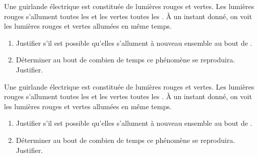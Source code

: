 \begin{exercice*}
    Une guirlande électrique est constituée de lumières rouges et vertes.
    Les lumières rouges s'allument toutes les  et les vertes toutes les .
    À un instant donné, on voit les lumières rouges et vertes allumées en même temps.
    \begin{enumerate}
        \item Justifier s'il est possible qu'elles s'allument à nouveau ensemble au bout de .
        \item Déterminer au bout de combien de temps ce phénomène se reproduira. Justifier.
    \end{enumerate}    
\end{exercice*}
\begin{corrige}
        Une guirlande électrique est constituée de lumières rouges et vertes.
        Les lumières rouges s'allument toutes les  et les vertes toutes les .
        À un instant donné, on voit les lumières rouges et vertes allumées en même temps.
    
        \begin{enumerate}
            \item Justifier s'il est possible qu'elles s'allument à nouveau ensemble au bout de .
            
            {}            
            \item Déterminer au bout de combien de temps ce phénomène se reproduira. Justifier.


        \end{enumerate}                    
\end{corrige}

